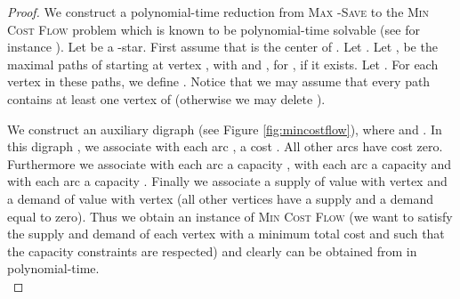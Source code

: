 \documentclass[10pt]{article}
\newcommand{\probtitle}[1]{\textsc{#1}}
\begin{document}
\begin{proof}
We construct a polynomial-time reduction from \probtitle{Max -Save} to the \probtitle{Min Cost Flow} problem which is known to be polynomial-time solvable (see for instance \cite{orlin}).
Let  be a -star. First assume that  is the center of . Let . Let  ,   be the maximal paths of  starting at vertex , with  and , for , if it exists. Let . For each vertex  in these paths, we define . Notice that we may assume that every path  contains at least one vertex of  (otherwise we may delete ).

We construct an auxiliary digraph  (see Figure \ref{fig:mincostflow}), where   and . In this digraph , we associate with each arc , a cost . All other arcs have cost zero. Furthermore we associate with each arc  a capacity , with each arc  a capacity  and with each arc  a capacity . Finally we associate a supply of value  with vertex  and a demand of value  with vertex  (all other vertices have a supply and a demand equal to zero). Thus we obtain an instance of \probtitle{Min Cost Flow} (we want to satisfy the supply and demand of each vertex with a minimum total cost and such that the capacity constraints are respected) and clearly  can be obtained from  in polynomial-time.\\


\end{proof}
\end{document}

